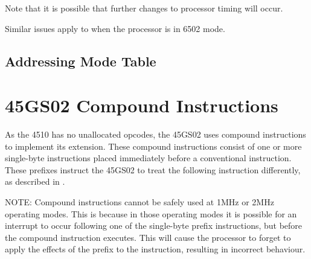 Note that it is possible that further changes to processor timing will occur.

Similar issues apply to when the processor is in 6502 mode.

\begin{center}
\end{center}

\subsection{Addressing Mode Table}

\begin{center}
\end{center}




\section{45GS02 Compound Instructions}

As the 4510 has no unallocated opcodes, the 45GS02 uses compound instructions
to implement its extension.  These compound instructions consist of one or
more single-byte instructions placed immediately before a conventional
instruction.  These prefixes instruct the 45GS02 to treat the following instruction
differently, as described in .

NOTE: Compound instructions cannot be safely used at 1MHz or 2MHz operating modes.
This is because in those operating modes it is possible for an interrupt to occur
following one of the single-byte prefix instructions, but before the compound
instruction executes.  This will cause the processor to forget to apply the effects
of the prefix to the instruction, resulting in incorrect behaviour.







